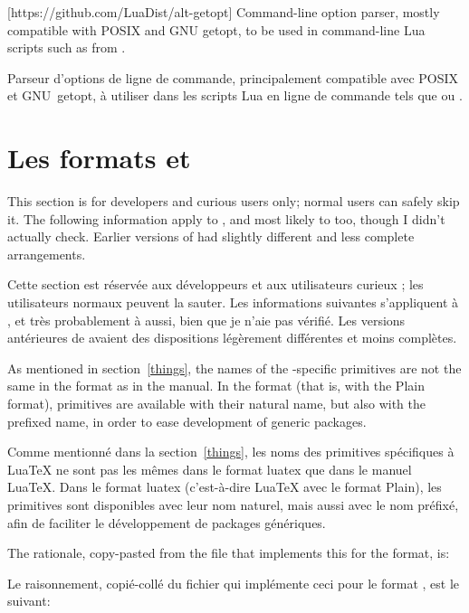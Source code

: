 \documentclass{lltxdoc}
\begin{document}
[https://github.com/LuaDist/alt-getopt]
Command-line option parser, mostly compatible with POSIX and GNU getopt, to be
used in command-line Lua scripts such as  from
.

Parseur d'options de ligne de commande, principalement compatible avec POSIX et GNU~getopt, à utiliser dans les scripts Lua en ligne de commande tels que  ou .

\section{Les formats  et }\label{formats}

This section is for developers and curious users only; normal users can safely
skip it. The following information apply to , and most likely to
 too, though I didn't actually check. Earlier versions of \texlive
had slightly different and less complete arrangements.

Cette section est réservée aux développeurs et aux utilisateurs curieux ; les utilisateurs normaux peuvent la sauter. Les informations suivantes s'appliquent à , et très probablement à  aussi, bien que je n'aie pas vérifié. Les versions antérieures de \texlive avaient des dispositions légèrement différentes et moins complètes.

As mentioned in section~\ref{things}, the names of the \luatex-specific
primitives are not the same in the  format as in the \luatex
manual. In the  format (that is, \luatex with the Plain format),
primitives are available with their natural name, but also with the prefixed
name, in order to ease development of generic packages.

Comme mentionné dans la section~\ref{things}, les noms des primitives spécifiques à LuaTeX ne sont pas les mêmes dans le format luatex que dans le manuel LuaTeX. Dans le format luatex (c'est-à-dire LuaTeX avec le format Plain), les primitives sont disponibles avec leur nom naturel, mais aussi avec le nom préfixé, afin de faciliter le développement de packages génériques.

The rationale, copy-pasted from the file  that
implements this for the  format, is:

Le raisonnement, copié-collé du fichier  qui implémente ceci pour le format , est le suivant:
\end{document}
